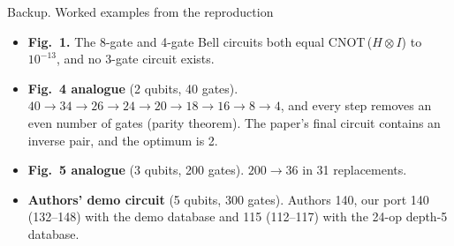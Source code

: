 \documentclass[aspectratio=169,10pt]{beamer}
\begin{document}
\begin{frame}{Backup. Worked examples from the reproduction}
  \begin{itemize}\setlength{\itemsep}{0.6em}
    \item \textbf{Fig.~1.} The 8-gate and 4-gate Bell circuits both equal CNOT\,(\(H\otimes I\)) to \(10^{-13}\), and no 3-gate circuit exists.
    \item \textbf{Fig.~4 analogue} (2 qubits, 40 gates). \(40\to34\to26\to24\to20\to18\to16\to8\to4\), and every step removes an even number of gates (parity theorem).
          The paper's final circuit contains an inverse pair, and the optimum is 2.
    \item \textbf{Fig.~5 analogue} (3 qubits, 200 gates). \(200\to36\) in 31 replacements.
    \item \textbf{Authors' demo circuit} (5 qubits, 300 gates). Authors 140, our port 140 (132--148) with the demo database and 115 (112--117) with the 24-op depth-5 database.
  \end{itemize}
\end{frame}
\end{document}
